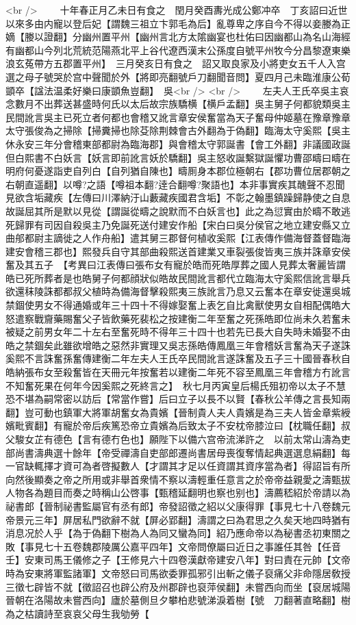 <br />
　　十年春正月乙未日有食之　閏月癸酉夀光成公鄭冲卒　丁亥詔曰近世以來多由内寵以登后妃【謂魏三祖立卞郭毛為后】亂尊卑之序自今不得以妾媵為正嫡【媵以證翻】分幽州置平州【幽州言北方太隂幽宴也杜佑曰因幽都山為名山海經有幽都山今列北荒統范陽燕北平上谷代遼西漢末公孫度自號平州牧今分昌黎遼東樂浪玄菟帶方五郡置平州】　三月癸亥日有食之　詔又取良家及小將吏女五千人入宫選之母子號哭於宫中聲聞於外【將即亮翻號戶刀翻聞音問】夏四月己未臨淮康公荀顗卒【諡法温柔好樂曰康顗魚豈翻】　吳<br />
<br />
　　左夫人王氏卒吳主哀念數月不出葬送甚盛時何氏以太后故宗族驕横【横戶孟翻】吳主舅子何都貌類吳主民間訛言吳主已死立者何都也會稽又訛言章安侯奮當為天子奮母仲姬墓在豫章豫章太守張俊為之掃除【掃糞掃也除芟除荆棘會古外翻為于偽翻】臨海太守奚熙【吳主休永安三年分會稽東部都尉為臨海郡】與會稽太守郭誕書【會工外翻】非議國政誕但白熙書不白妖言【妖言即前訛言妖於驕翻】吳主怒收誕繫獄誕懼功曹邵疇曰疇在明府何憂遂詣吏自列白【自列猶自陳也】疇厠身本郡位極朝右【郡功曹位居郡朝之右朝直遥翻】以噂?之語【噂祖本翻?逹合翻噂?聚語也】本非事實疾其醜聲不忍聞見欲含垢藏疾【左傳曰川澤納汙山藪藏疾國君含垢】不彰之翰墨鎮躁歸静使之自息故誕屈其所是默以見從【謂誕從疇之說默而不白妖言也】此之為愆實由於疇不敢逃死歸罪有司因自殺吳主乃免誕死送付建安作船【宋白曰吳分侯官之地立建安縣又立曲郍都尉主謫徙之人作舟船】遣其舅三郡督何植收奚熙【江表傳作備海督蓋督臨海建安會稽三郡也】熙發兵自守其部曲殺熙送首建業又車裂張俊皆夷三族并誅章安侯奮及其五子　【考異曰江表傳曰張布女有寵於皓而死皓厚葬之國人見葬太奢麗皆謂皓已死所葬者是也皓舅子何都顔狀似皓故民間訛言都代立臨海太守奚熙信訛言舉兵欲還秣陵誅都都叔父植時為備海督擊殺熙夷三族訛言乃息又云奮本在章安徙還吳城禁錮使男女不得通婚或年三十四十不得嫁娶奮上表乞自比禽獸使男女自相配偶皓大怒遣察戰齎藥賜奮父子皆飲藥死裴松之按建衡二年至奮之死孫皓即位尚未久若奮未被疑之前男女年二十左右至奮死時不得年三十四十也若先已長大自失時未婚娶不由皓之禁錮矣此雖欲增皓之惡然非實理又吳志孫皓傳鳳凰三年會稽妖言奮為天子遂誅奚熙不言誅奮孫奮傳建衡二年左夫人王氏卒民間訛言遂誅奮及五子三十國晉春秋自皓納張布女至殺奮皆在天冊元年按奮若以建衡二年死不容至鳳凰三年會稽方冇訛言不知奮死果在何年今因奚熙之死終言之】　秋七月丙寅皇后楊氏殂初帝以太子不慧恐不堪為嗣常密以訪后【常當作嘗】后曰立子以長不以賢【春秋公羊傳之言長知兩翻】豈可動也鎮軍大將軍胡奮女為貴嬪【晉制貴人夫人貴嬪是為三夫人皆金章紫綬嬪毗賓翻】有寵於帝后疾篤恐帝立貴嬪為后致太子不安枕帝膝泣曰【枕職任翻】叔父駿女芷有德色【言有德冇色也】願陛下以備六宫帝流涕許之　以前太常山濤為吏部尚書濤典選十餘年【帝受禪濤自吏部郎遷尚書居母喪復奪情起典選選息絹翻】每一官缺輒擇才資可為者啓擬數人【才謂其才足以任資謂其資序當為者】得詔旨有所向然後顯奏之帝之所用或非舉首衆情不察以濤輕重任意言之於帝帝益親愛之濤甄拔人物各為題目而奏之時稱山公啓事【甄稽延翻明也察也别也】濤薦嵇紹於帝請以為祕書郎【晉制祕書監屬官有丞有郎】帝發詔徵之紹以父康得罪【事見七十八卷魏元帝景元三年】屏居私門欲辭不就【屏必郢翻】濤謂之曰為君思之久矣天地四時猶有消息况於人乎【為于偽翻下樹為人為同又蠻為同】紹乃應命帝以為秘書丞初東關之敗【事見七十五卷魏郡陵厲公嘉平四年】文帝問僚屬曰近日之事誰任其咎【任音壬】安東司馬王儀修之子【王修見六十四卷漢獻帝建安八年】對曰責在元帥【文帝時為安東將軍監諸軍】文帝怒曰司馬欲委罪孤邪引出斬之儀子裒痛父非命隱居敎授三徵七辟皆不就【徵詔召也辟公府及州郡辟也裒萍侯翻】未嘗西向而坐【裒居城陽晉朝在洛陽故未嘗西向】廬於墓側旦夕攀柏悲號涕淚着樹【號　刀翻著直略翻】樹為之枯讀詩至哀哀父母生我劬勞【